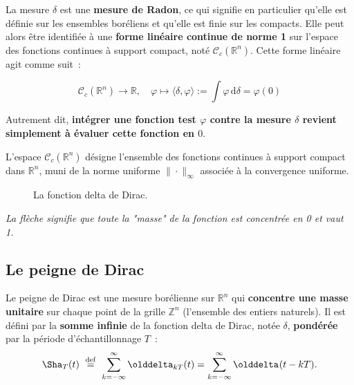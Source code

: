 La mesure $\delta$ est une \textbf{mesure de Radon}, ce qui signifie en 
particulier qu’elle est définie sur les ensembles boréliens et qu’elle est finie 
sur les compacts. Elle peut alors être identifiée à une 
\textbf{forme linéaire continue de norme 1} sur l’espace des fonctions continues 
à support compact, noté $\mathcal{C}_c(\mathbb{R}^n)$. Cette forme linéaire agit 
comme suit~:

\[
\mathcal{C}_c(\mathbb{R}^n) \to \mathbb{R}, \quad \varphi \mapsto \langle \delta, \varphi \rangle := \int \varphi \, \mathrm{d}\delta = \varphi(0)
\]

Autrement dit, \textbf{intégrer une fonction test $\varphi$ contre la mesure 
$\delta$ revient simplement à évaluer cette fonction en $0$}.

L’espace $\mathcal{C}_c(\mathbb{R}^n)$ désigne l’ensemble des fonctions 
continues à support compact dans $\mathbb{R}^n$, muni de la norme uniforme 
$\|\cdot\|_\infty$ associée à la convergence uniforme.

\begin{figure}[!ht]
    \centering
    \caption{La fonction delta de Dirac.}
    \label{figDirac}
\end{figure}

\emph{ La flèche signifie que toute la "masse" de la fonction est concentrée en 0 et vaut 1.}

\subsection{Le peigne de Dirac}
\label{secPeigneDirac}
Le peigne de Dirac est une mesure borélienne sur $\mathbb{R}^n$ qui
\textbf{concentre une masse unitaire} sur chaque point de la grille
\(\mathbb{Z}^n\) (l’ensemble des entiers naturels). Il est défini par la
\textbf{somme infinie} de la fonction delta de Dirac, notée $\delta$,
\textbf{pondérée} par la période d’échantillonnage $T$~:
\[
    \Sha_T (t)\ \stackrel{\mathrm{def}}{=}\  \sum_{k=-\infty}^{\infty}\delta_{k T}(t) = \sum_{k=-\infty}^{\infty}\delta(t-kT).
\]

